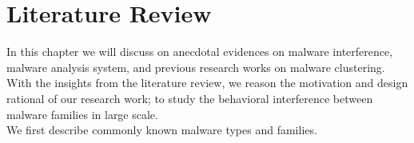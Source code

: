 \chapter{Literature Review}\label{chapter:literature_review}
In this chapter we will discuss on anecdotal evidences on malware interference, malware analysis system, and previous research works on malware clustering.
With the insights from the literature review, we reason the motivation and design rational of our research work; to study the behavioral interference between malware families in large scale.\\
We first describe commonly known malware types and families.
